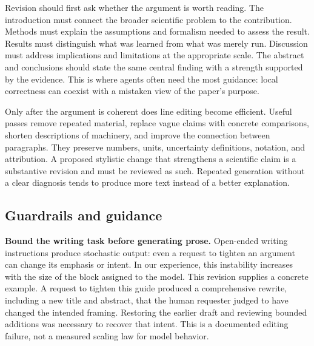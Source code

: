 \documentclass[aps,prd,reprint,nofootinbib]{revtex4-2}
\begin{document}
Revision should first ask whether the argument is worth reading. The introduction must connect the broader scientific problem to the contribution. Methods must explain the assumptions and formalism needed to assess the result. Results must distinguish what was learned from what was merely run. Discussion must address implications and limitations at the appropriate scale. The abstract and conclusions should state the same central finding with a strength supported by the evidence. This is where agents often need the most guidance: local correctness can coexist with a mistaken view of the paper's purpose.

Only after the argument is coherent does line editing become efficient. Useful passes remove repeated material, replace vague claims with concrete comparisons, shorten descriptions of machinery, and improve the connection between paragraphs. They preserve numbers, units, uncertainty definitions, notation, and attribution. A proposed stylistic change that strengthens a scientific claim is a substantive revision and must be reviewed as such. Repeated generation without a clear diagnosis tends to produce more text instead of a better explanation.

\subsection{Guardrails and guidance}
\textbf{Bound the writing task before generating prose.} Open-ended writing instructions produce stochastic output: even a request to tighten an argument can change its emphasis or intent. In our experience, this instability increases with the size of the block assigned to the model. This revision supplies a concrete example. A request to tighten this guide produced a comprehensive rewrite, including a new title and abstract, that the human requester judged to have changed the intended framing. Restoring the earlier draft and reviewing bounded additions was necessary to recover that intent. This is a documented editing failure, not a measured scaling law for model behavior.
\end{document}
